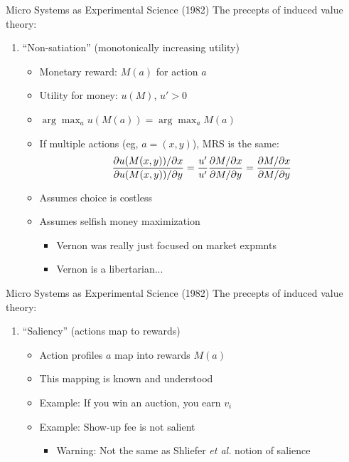 \begin{frame}{Micro Systems as Experimental Science (1982)}
    The precepts of induced value theory:
    \begin{enumerate}
        \item ``Non-satiation'' (monotonically increasing utility)
        \begin{itemize}
            \item Monetary reward: $M(a)$ for action $a$
            \item Utility for money: $u(M)$, $u'>0$
            \item $\arg\max_a u(M(a)) = \arg\max_a M(a)$
            \item If multiple actions (eg, $a=(x,y)$), MRS is the same:
            $$
            \frac{\partial u(M(x,y))/\partial x}{\partial u(M(x,y))/\partial y} = \frac{u'}{u'} \frac{\partial M/\partial x}{\partial M/\partial y} = \frac{\partial M/\partial x}{\partial M/\partial y}
            $$
            \item Assumes choice is costless
            \item Assumes selfish money maximization
            \begin{itemize}
                \item Vernon was really just focused on market expmnts
                \item Vernon is a libertarian...
            \end{itemize}
        \end{itemize}
        \seti
    \end{enumerate}
\end{frame}

\begin{frame}{Micro Systems as Experimental Science (1982)}
    The precepts of induced value theory:
    \begin{enumerate}
        \conti
        \item ``Saliency'' (actions map to rewards)
        \begin{itemize}
            \item Action profiles $a$ map into rewards $M(a)$
            \item This mapping is known and understood
            \item Example: If you win an auction, you earn $v_i$
            \item Example: Show-up fee is not salient
            \begin{itemize}
                \item Warning: Not the same as Shliefer \textit{et al.} notion of salience
            \end{itemize}
        \end{itemize}
        \seti
    \end{enumerate}
\end{frame}

